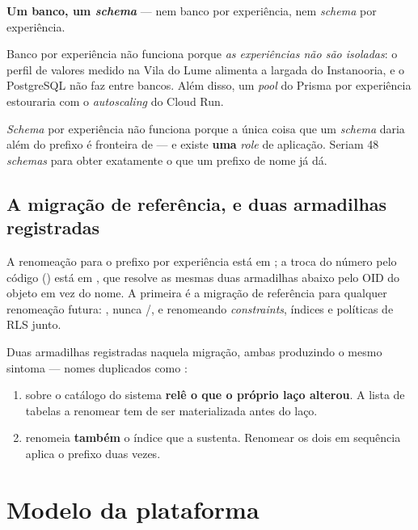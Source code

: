 \begin{decisao}
\textbf{Um banco, um \emph{schema}} --- nem banco por experiência, nem
\emph{schema} por experiência.

Banco por experiência não funciona porque \emph{as experiências não são
isoladas}: o perfil de valores medido na Vila do Lume alimenta a largada do
Instanooria, e o PostgreSQL não faz  entre bancos. Além disso, um
\emph{pool} do Prisma por experiência estouraria  com o
\emph{autoscaling} do Cloud Run.

\emph{Schema} por experiência não funciona porque a única coisa que um
\emph{schema} daria além do prefixo é fronteira de  --- e existe
\textbf{uma} \emph{role} de aplicação. Seriam 48 \emph{schemas} para obter
exatamente o que um prefixo de nome já dá.
\end{decisao}

\subsection{A migração de referência, e duas armadilhas registradas}

A renomeação para o prefixo por experiência está em
; a troca do número pelo código
() está em , que
resolve as mesmas duas armadilhas abaixo pelo OID do objeto em vez do nome. A
primeira é a migração de referência para
qualquer renomeação futura: , nunca /, e
renomeando \emph{constraints}, índices e políticas de RLS junto.

\begin{atencao}
Duas armadilhas registradas naquela migração, ambas produzindo o mesmo sintoma
--- nomes duplicados como :

\begin{enumerate}
  \item {} sobre o catálogo do sistema \textbf{relê o que o
    próprio laço alterou}. A lista de tabelas a renomear tem de ser materializada
    antes do laço.
  \item {} renomeia \textbf{também} o índice que a sustenta.
    Renomear os dois em sequência aplica o prefixo duas vezes.
\end{enumerate}
\end{atencao}

\section{Modelo da plataforma}

